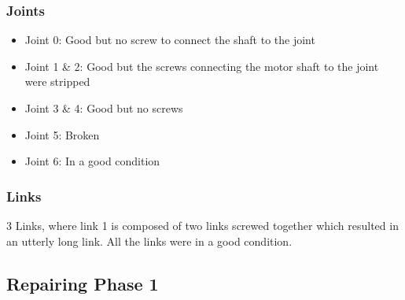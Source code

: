 \documentclass[11pt,a4paper]{report}
\begin{document}
\subsubsection{Joints}
\begin{itemize}
\item Joint 0: Good but no screw to connect the shaft to the joint
\item Joint 1 \& 2: Good but the screws connecting the motor shaft to the joint were stripped 
\item Joint 3 \& 4: Good but no screws
\item Joint 5: Broken
\item Joint 6: In a good condition
\end{itemize}
\subsubsection{Links}
3 Links, where link 1 is composed of two links screwed together which resulted in an utterly long link. All the links were in a good condition.
\subsection{Repairing Phase 1}
\end{document}
